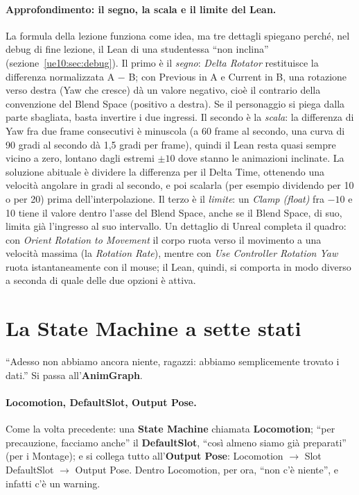 \paragraph{Approfondimento: il segno, la scala e il limite del Lean.} La formula della
lezione funziona come idea, ma tre dettagli spiegano perché, nel debug di fine lezione,
il Lean di una studentessa ``non inclina'' (sezione~\ref{ue10:sec:debug}). Il primo è il
\emph{segno}: \emph{Delta Rotator} restituisce la differenza normalizzata A $-$ B; con
Previous in A e Current in B, una rotazione verso destra (Yaw che cresce) dà un valore
negativo, cioè il contrario della convenzione del Blend Space (positivo a destra). Se il
personaggio si piega dalla parte sbagliata, basta invertire i due ingressi. Il secondo è
la \emph{scala}: la differenza di Yaw fra due frame consecutivi è minuscola (a 60 frame
al secondo, una curva di 90 gradi al secondo dà 1,5 gradi per frame), quindi il Lean resta
quasi sempre vicino a zero, lontano dagli estremi $\pm 10$ dove stanno le animazioni
inclinate. La soluzione abituale è dividere la differenza per il Delta Time, ottenendo una
velocità angolare in gradi al secondo, e poi scalarla (per esempio dividendo per 10 o per
20) prima dell'interpolazione. Il terzo è il \emph{limite}: un \emph{Clamp (float)} fra
$-10$ e 10 tiene il valore dentro l'asse del Blend Space, anche se il Blend Space, di suo,
limita già l'ingresso al suo intervallo. Un dettaglio di Unreal completa il quadro: con
\emph{Orient Rotation to Movement} il corpo ruota verso il movimento a una velocità
massima (la \emph{Rotation Rate}), mentre con \emph{Use Controller Rotation Yaw} ruota
istantaneamente con il mouse; il Lean, quindi, si comporta in modo diverso a seconda di
quale delle due opzioni è attiva.

\section{La State Machine a sette stati}
\label{ue10:sec:sm}

``Adesso non abbiamo ancora niente, ragazzi: abbiamo semplicemente trovato i dati.'' Si
passa all'\textbf{AnimGraph}.

\paragraph{Locomotion, DefaultSlot, Output Pose.} Come la volta precedente: una
\textbf{State Machine} chiamata \textbf{Locomotion}; ``per precauzione, facciamo anche''
il \textbf{DefaultSlot}, ``così almeno siamo già preparati'' (per i Montage); e si collega
tutto all'\textbf{Output Pose}: Locomotion $\rightarrow$ Slot DefaultSlot $\rightarrow$
Output Pose. Dentro Locomotion, per ora, ``non c'è niente'', e infatti c'è un warning.

